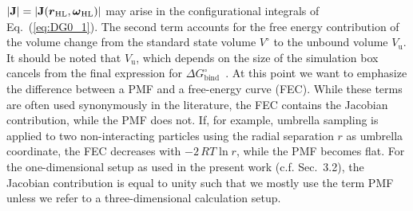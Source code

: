 \documentclass[9pt,lessons,pubversion]{livecoms}
\begin{document}
$\left| \text{\boldmath $\mathrm{J}$} \right| = \left| \text{\boldmath $\mathrm{J}$}(\text{\boldmath $r$}_\mathrm{HL}, \text{\boldmath$\omega$}_\mathrm{HL})  \right|$
may arise in the configurational integrals of Eq.~(\ref{eq:DG0_1}). 
The second term  accounts for the free energy contribution of the volume change from the standard state volume $V^\circ$ to the unbound volume $V_\mathrm{u}$. 
It should be noted that $V_\mathrm{u}$, which depends on the size of the simulation box cancels from the final expression for $\Delta G^\circ_\mathrm{bind}$~\cite{general2010note}.
At this point we want to emphasize the difference between a PMF and a free-energy curve (FEC).
While these terms are often used synonymously in the literature, the FEC contains the Jacobian contribution, while the PMF does not. 
If, for example, umbrella sampling is applied to two non-interacting particles using the radial separation $r$ as umbrella coordinate, the FEC decreases with $-2 \, RT \ln r$, while the PMF becomes flat.
For the one-dimensional setup as used in the present work (c.f. Sec.~3.2), the Jacobian contribution is equal to unity such that we mostly use the term PMF unless we refer to a three-dimensional calculation setup.
\end{document}
